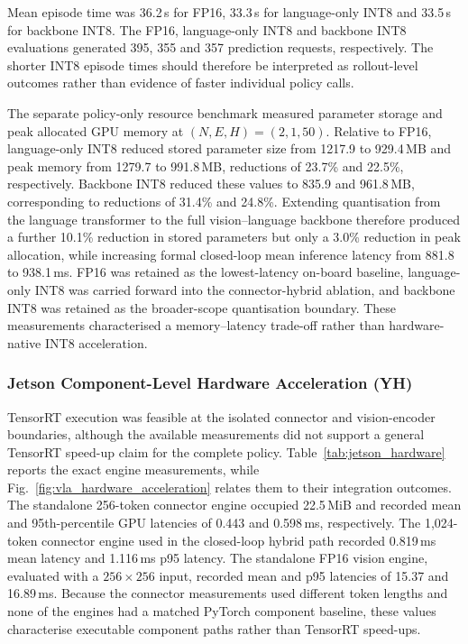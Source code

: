 Mean episode time was 36.2\,s for FP16, 33.3\,s for language-only INT8 and
33.5\,s for backbone INT8. The FP16, language-only INT8 and backbone INT8
evaluations generated 395, 355 and 357 prediction requests, respectively.
The shorter INT8 episode times should therefore be interpreted as rollout-level
outcomes rather than evidence of faster individual policy calls.

The separate policy-only resource benchmark measured parameter storage and peak
allocated GPU memory at \((N,E,H)=(2,1,50)\). Relative to FP16, language-only
INT8 reduced stored parameter size from 1217.9 to 929.4\,MB and peak memory
from 1279.7 to 991.8\,MB, reductions of 23.7\% and 22.5\%, respectively.
Backbone INT8 reduced these values to 835.9 and 961.8\,MB, corresponding to
reductions of 31.4\% and 24.8\%. Extending quantisation from the language
transformer to the full vision--language backbone therefore produced a further
10.1\% reduction in stored parameters but only a 3.0\% reduction in peak
allocation, while increasing formal closed-loop mean inference latency from
881.8 to 938.1\,ms. FP16 was retained as the lowest-latency on-board baseline,
language-only INT8 was carried forward into the connector-hybrid ablation, and
backbone INT8 was retained as the broader-scope quantisation boundary. These
measurements characterised a
memory--latency trade-off rather than hardware-native INT8 acceleration.


\subsubsection{Jetson Component-Level Hardware Acceleration (YH)}

TensorRT execution was feasible at the isolated connector and vision-encoder
boundaries, although the available measurements did not support a general
TensorRT speed-up claim for the complete policy. Table~\ref{tab:jetson_hardware}
reports the exact engine measurements, while
Fig.~\ref{fig:vla_hardware_acceleration} relates them to their integration
outcomes. The standalone
256-token connector engine occupied 22.5\,MiB and recorded mean and
95th-percentile GPU latencies of 0.443 and 0.598\,ms, respectively. The
1,024-token connector engine used in the closed-loop hybrid path recorded
0.819\,ms mean latency and 1.116\,ms p95 latency. The standalone FP16 vision
engine, evaluated with a \(256\times256\) input, recorded mean and p95 latencies
of 15.37 and 16.89\,ms. Because the connector measurements used different token
lengths and none of the engines had a matched PyTorch component baseline, these
values characterise executable component paths rather than TensorRT speed-ups.

